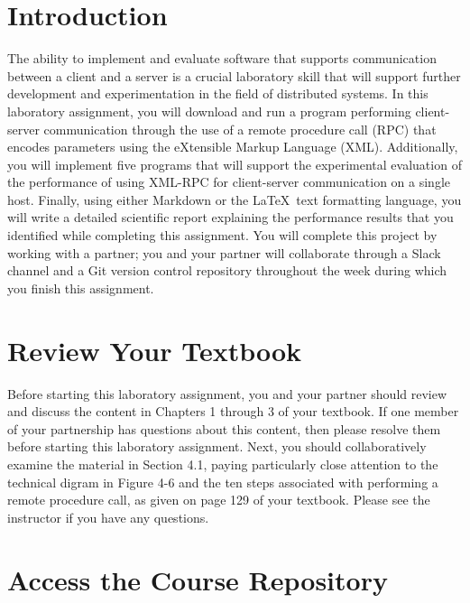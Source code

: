 

\usepackage[compact]{titlesec}



\section*{Introduction}

The ability to implement and evaluate software that supports communication between a client and a server is a crucial
laboratory skill that will support further development and experimentation in the field of distributed systems. In this
laboratory assignment, you will download and run a program performing client-server communication through the use of a
remote procedure call (RPC) that encodes parameters using the eXtensible Markup Language (XML). Additionally, you will
implement five programs that will support the experimental evaluation of the performance of using XML-RPC for
client-server communication on a single host. Finally, using either Markdown or the \LaTeX~text formatting language, you
will write a detailed scientific report explaining the performance results that you identified while completing this
assignment. You will complete this project by working with a partner; you and your partner will collaborate through a
Slack channel and a Git version control repository throughout the week during which you finish this assignment.

\section*{Review Your Textbook}

Before starting this laboratory assignment, you and your partner should review and discuss the content in Chapters 1
through 3 of your textbook. If one member of your partnership has questions about this content, then please resolve them
before starting this laboratory assignment. Next, you should collaboratively examine the material in Section 4.1, paying
particularly close attention to the technical digram in Figure 4-6 and the ten steps associated with performing a remote
procedure call, as given on page 129 of your textbook. Please see the instructor if you have any questions.

\section*{Access the Course Repository}

